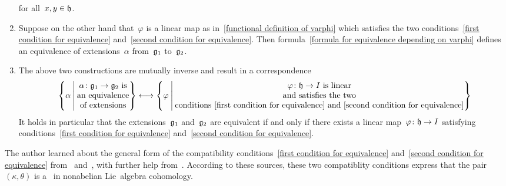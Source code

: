 \begin{theorem}
\begin{enumerate}[resume*]
      for all~$x, y \in \mathfrak{h}$.
    \item
      Suppose on the other hand that~$\varphi$ is a linear map as in~\eqref{functional definition of varphi} which satisfies the two conditions~\eqref{first condition for equivalence} and~\eqref{second condition for equivalence}.
      Then formula~\eqref{formula for equivalence depending on varphi} defines an equivalence of extensions~$\alpha$ from~$\mathfrak{g}_1$ to~$\mathfrak{g}_2$.
    \item
      The above two constructions are mutually inverse and result in a {\onetoonetext} correspondence
      \[
        \left\{
          \alpha
        \suchthat*
          \begin{tabular}{@{}c@{}}
            $\alpha \colon \glie_1 \to \glie_2$ is \\
            an equivalence \\
            of extensions
          \end{tabular}
        \right\}
        \onetoone
        \left\{
          \varphi
        \suchthat*
          \begin{tabular}{@{}c@{}}
            $\varphi \colon \hlie \to I$ is linear \\
            and satisfies the two \\
            conditions~\eqref{first condition for equivalence} and~\eqref{second condition for equivalence}
          \end{tabular}
        \right\}
      \]
      It holds in particular that the extensions~$\mathfrak{g}_1$ and~$\mathfrak{g}_2$ are equivalent if and only if there exists a linear map~$\varphi \colon \hlie \to I$ satisfying conditions~\eqref{first condition for equivalence} and~\eqref{second condition for equivalence}.
  \end{enumerate}
\end{theorem}


\begin{remark}
  The author learned about the general form of the compatibility conditions~\eqref{first condition for equivalence} and~\eqref{second condition for equivalence} from~\cite{extension_of_lie_algebras_nlab} and~\cite{nonabelian_lie_algebra_cohomology_nlab}, with further help from~\cite{extension_of_lie_algebras_arxiv}.
  According to these sources, these two compatiblity conditions express that the pair~$(\kappa, \theta)$ is a~ in nonabelian Lie~algebra cohomology.
\end{remark}


